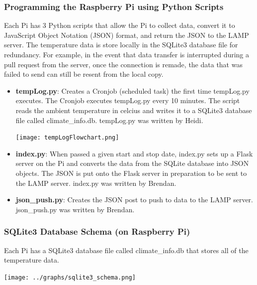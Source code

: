 \documentclass{article}
\begin{document}
			\subsubsection{Programming the Raspberry Pi using Python Scripts}
				Each Pi has 3 Python scripts that allow the Pi to collect data, convert it to JavaScript Object
				Notation (JSON) format, and return the JSON to the LAMP server. The temperature data is store locally
				in the SQLite3 database file for redundancy. For example, in the event that data transfer is interrupted
				during a pull request from the server, once the connection is remade, the data that was failed to send
				can still be resent from the local copy.

				\begin{itemize}
					\item {\bfseries tempLog.py}: Creates a Cronjob (scheduled task) the first time tempLog.py executes. The Cronjob 
									  executes tempLog.py every 10 minutes. The script reads the ambient temperature
									  in celcius and writes it to a SQLite3 database file called climate\_info.db. tempLog.py was
									  written by Heidi.
						\begin{center}
							\texttt{[image: tempLogFlowchart.png]}\\
						\end{center}
						
					\item {\bfseries index.py}: When passed a given start and stop date, index.py sets up a Flask server on the Pi and 
									converts the data from the SQLite database into JSON objects. The JSON is put onto the Flask server in
									preparation to be sent to the LAMP server. index.py was written by Brendan.
					\item {\bfseries json\_push.py}: Creates the JSON post to push to data to the LAMP server. json\_push.py was written by Brendan.
				\end{itemize}
				
			\subsubsection{SQLite3 Database Schema (on Raspberry Pi)}	
				Each Pi has a SQLite3 database file called climate\_info.db that stores all of the temperature data.
				
				\begin{center}
					\texttt{[image: ../graphs/sqlite3\_schema.png]}
				\end{center}
			
\end{document}
